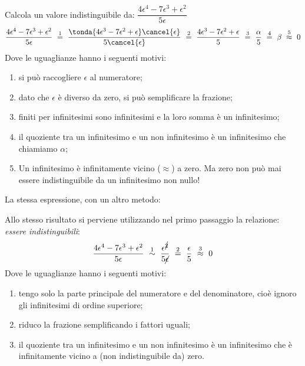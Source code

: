 \begin{esempio}
Calcola un valore indistinguibile da:
\(\dfrac{4 \epsilon^4 -7 \epsilon^3 + \epsilon^2}{5 \epsilon}\)
\[\dfrac{4 \epsilon^4 -7 \epsilon^3 + \epsilon^2}{5 \epsilon} 
~ \stackrel{1}{=} ~
  \dfrac{\tonda{4 \epsilon^3 -7 \epsilon^2 + \epsilon} \cancel{\epsilon}}
                    {5 \cancel{\epsilon}} 
~ \stackrel{2}{=} ~ 
  \dfrac{4 \epsilon^3 -7 \epsilon^2 + \epsilon}{5}
~ \stackrel{3}{=} ~
  \dfrac{\alpha}{5}
~ \stackrel{4}{=} ~
  \beta
~ \stackrel{5}{\approx} ~
  0\]
Dove le uguaglianze hanno i seguenti motivi:
\begin{enumerate} [nosep]
 \item si può raccogliere \(\epsilon\) al numeratore; 
 \item dato che \(\epsilon\) è diverso da zero, si può semplificare la 
frazione; 
 \item finiti per infinitesimi sono infinitesimi e la loro
somma è un infinitesimo;
 \item il quoziente tra un infinitesimo e un non infinitesimo è un 
infinitesimo che chiamiamo \(\alpha\);
 \item Un infinitesimo è infinitamente vicino (\(\approx\)) a zero. 
Ma zero non può mai essere indistinguibile da un infinitesimo non nullo!
\end{enumerate}
\end{esempio}

\begin{esempio}
La stessa espressione, con un altro metodo:

Allo stesso risultato si perviene utilizzando nel primo passaggio la 
relazione: \emph{essere indistinguibili}:
\[\dfrac{4 \epsilon^4 -7 \epsilon^3 + \epsilon^2}{5 \epsilon} 
~ \stackrel{1}{\sim} ~
  \dfrac{\epsilon^{\cancel{2}}}{5 \cancel{\epsilon}} 
~ \stackrel{2}{=} ~
  \dfrac{\epsilon}{5}
~ \stackrel{3}{\approx} ~
  0\]
Dove le uguaglianze hanno i seguenti motivi:
\begin{enumerate} [nosep]
 \item tengo solo la parte principale del numeratore e del denominatore, 
cioè ignoro gli infinitesimi di ordine superiore; 
 \item riduco la frazione semplificando i fattori uguali; 
 \item il quoziente tra un infinitesimo e un non infinitesimo è un 
infinitesimo che è infinitamente vicino a (non indistinguibile da) zero.
\end{enumerate}
\end{esempio}

